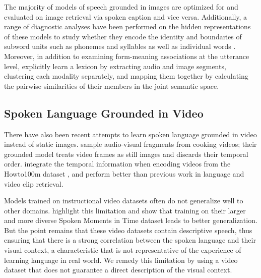 The majority of models of speech grounded in images are optimized for and evaluated on
image retrieval via spoken caption and vice versa. Additionally, a range of
diagnostic analyses have been performed on the hidden
representations of these models to study whether they encode 
the identity and boundaries of subword units such as phonemes
and syllables \cite{alishahi-etal-2017-encoding, harwath2019towards,
  khorrami_2021} as well as individual words
\cite{chrupala-etal-2017-representations,havard2019word}. Moreover, in
addition to examining form-meaning associations at the utterance
level, \citet{harwath-glass-2017-learning} explicitly learn a lexicon by
extracting audio and image segments, clustering each modality
separately, and mapping them together by calculating the pairwise
similarities of their members in the joint semantic space.

\subsection{Spoken Language Grounded in Video}
\label{sec:video}
There have also been recent attempts to learn spoken language grounded
in video instead of static images.  \citet{boggust2019grounding}
sample audio-visual fragments from cooking videos;  their
grounded model treats video frames as still images and discards their
temporal order.
\citet{rouditchenko2020avlnet} integrate the temporal information when
encoding videos from the Howto100m dataset \cite{miech2019howto100m},
and perform better than previous work in language and video clip
retrieval.

Models trained on instructional video datasets often do not
generalize well to other domains. \citet{monfort2021spokenmoments}
highlight this limitation and show that training on their larger and
more diverse Spoken Moments in Time dataset leads to better
generalization.  But the point remains that these video datasets contain
descriptive speech, thus ensuring that there is a strong correlation
between the spoken language and their visual context, a characteristic
that is not representative of the experience of learning language in
 real world. We remedy this limitation by using a video dataset that does 
 not guarantee a direct description of the visual context. 

